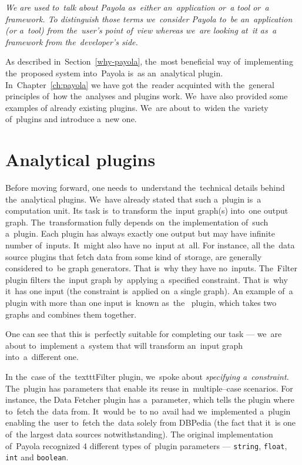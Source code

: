 \emph{We are used to~talk about Payola as~either an~application or~a tool or~a framework. To
distinguish those terms we~consider Payola to~be an~application (or a~tool) from the~user’s
point of~view whereas we~are looking at~it as~a framework from the~developer’s side.}

As described in~Section~\ref{why-payola}, the~most beneficial way of~implementing the~proposed system into~Payola is~as an~analytical plugin. In~Chapter~\ref{ch:payola}
we have got the~reader acquinted with the~general principles of~how the~analyses and plugins work. We~have also provided some examples 
of already existing plugins. We~are about to~widen the~variety of~plugins and 
introduce a~new one.

\section{Analytical plugins}
Before moving forward, one needs to~understand the~technical 
details behind the~analytical plugins. We~have already stated that such a~plugin is~a computation unit. Its task is~to transform the~input graph(s) into~one output 
graph. The~transformation fully depends on~the implementation of~such a~plugin. Each plugin has always exactly one output but may have infinite number of~inputs. It~might also have no~input at~all. For instance, all the~data 
source plugins that fetch data from some kind of~storage, are generally considered to~be
graph generators. That is~why they have no~inputs. The~Filter 
plugin filters the~input graph by~applying a~specified constraint. That is~why it~has one input (the constraint is~applied on~a single graph).
An example of~a plugin with more than one input is~known as~the~ 
plugin, which takes two graphs and combines them together.

One can see that this is~perfectly suitable for completing our task --- we~are about to~implement a~system that will transform an~input graph into~a~different one.

In the~case of~the~texttt{Filter} plugin, we~spoke about \emph{specifying a~constraint}. The~plugin has parameters that enable its reuse in~multiple--case scenarios. For instance,
the Data Fetcher plugin has a~parameter, which tells 
the plugin where to~fetch the~data from. It~would be~to no~avail had we~implemented a~plugin
enabling the~user to~fetch the~data solely from DBPedia (the fact that it~is one of~the largest data
sources notwithstanding).
The original implementation of~Payola recognized 4 different types of~plugin 
parameters --- \texttt{string}, \texttt{float}, \texttt{int} and \texttt{boolean}. 

